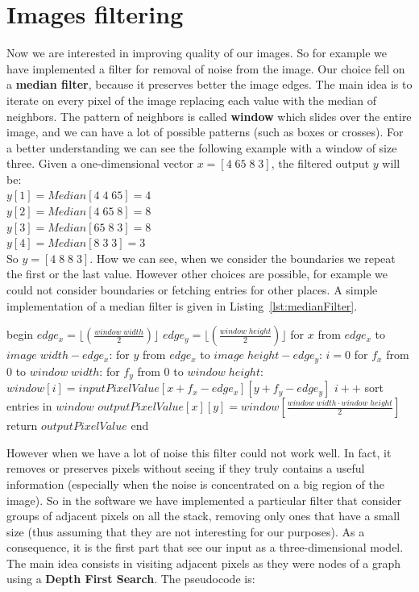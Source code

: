\section{Images filtering}\label{sec32:ImagesFiltering}
Now we are interested in improving quality of our images. So for example we have implemented a filter for removal of noise from the image. Our choice fell on a \textbf{median filter}, because it preserves better the image edges. The main idea is to iterate on every pixel of the image replacing each value with the median of neighbors. The pattern of neighbors is called \textbf{window} which slides over the entire image, and we can have a lot of possible patterns (such as boxes or crosses). For a better understanding we can see the following example with a window of size three. Given a one-dimensional vector $x = [4\; 65\; 8\; 3]$, the filtered output $y$ will be:\\
$y[1] = Median[4\; 4\; 65] = 4$\\
$y[2] = Median[4\; 65\; 8] = 8$\\
$y[3] = Median[65\; 8\; 3] = 8$\\
$y[4] = Median[8\; 3\; 3] = 3$\\
So $y = [4\; 8\; 8\; 3]$. How we can see, when we consider the boundaries  we repeat the first or the last value. However other choices are possible, for example we could not consider boundaries or fetching entries for other places. A simple implementation of a median filter is given in Listing~\ref{lst:medianFilter}.

\begin{pseudo}[caption={Median filter}, label={lst:medianFilter}]
begin
  $edge_x = \lfloor(\frac{window\; width}{2})\rfloor$
  $edge_y = \lfloor(\frac{window\; height}{2})\rfloor$
  for $x$ from $edge_x$ to $image\; width - edge_x$:
    for $y$ from $edge_x$ to $image\; height - edge_y$:
      $i = 0$
      for $f_x$ from $0$ to $window\; width$:
        for $f_y$ from $0$ to $window\; height$:
          $window[i] = inputPixelValue[x + f_x - edge_x][y + f_y - edge_y]$
          $i++$
      sort entries in $window$
      $outputPixelValue[x][y] = window[\frac{window\; width \cdot window\; height}{2}]$
  return $outputPixelValue$
end       
\end{pseudo}

However when we have a lot of noise this filter could not work well. In fact, it removes or preserves pixels without seeing if they truly contains a useful information (especially when the noise is concentrated on a big region of the image). So in the software we have implemented a particular filter that consider groups of adjacent pixels on all the stack, removing only ones that have a small size (thus assuming that they are not interesting for our purposes). As a consequence, it is the first part that see our input as a three-dimensional model. The main idea consists in visiting adjacent pixels as they were nodes of a graph using a \textbf{Depth First Search}. The pseudocode is:

